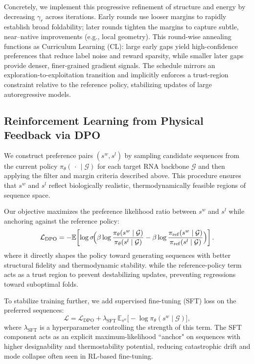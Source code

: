 Concretely, we implement this progressive refinement of structure and energy by decreasing $\gamma_r$ across iterations. Early rounds use looser margins to rapidly establish broad foldability; later rounds tighten the margins to capture subtle, near–native improvements (e.g., local geometry). This round-wise annealing functions as Curriculum Learning (CL): large early gaps yield high-confidence preferences that reduce label noise and reward sparsity, while smaller later gaps provide denser, finer-grained gradient signals. The schedule mirrors an exploration-to-exploitation transition and implicitly enforces a trust-region constraint relative to the reference policy, stabilizing updates of large autoregressive models.  


\subsection{Reinforcement Learning from Physical Feedback via DPO}
\label{subsec:rlpf_dpo}
We construct preference pairs $(s^w, s^l)$ by sampling candidate sequences from the current policy $\pi_\theta(\,\cdot\,\mid\mathcal{G})$ for each target RNA backbone $\mathcal{G}$ and then applying the filter and margin criteria described above. This procedure ensures that $s^w$ and $s^l$ reflect biologically realistic, thermodynamically feasible regions of sequence space.



Our objective maximizes the preference likelihood ratio between $s^w$ and $s^l$ while anchoring against the reference policy:
\begin{equation}
\mathcal{L}_{\mathrm{DPO}}
= -\mathbb{E}\!\left[
\log \sigma \!\Bigl(
\beta \log \frac{\pi_\theta(s^w \mid \mathcal{G})}{\pi_\theta(s^l \mid \mathcal{G})}
- \beta \log \frac{\pi_{\mathrm{ref}}(s^w \mid \mathcal{G})}{\pi_{\mathrm{ref}}(s^l \mid \mathcal{G})}
\Bigr)
\right].
\end{equation}
where it directly shapes the policy toward generating sequences with better structural fidelity and thermodynamic stability. 
while the reference-policy term acts as a trust region to prevent destabilizing updates, preventing regressions toward suboptimal folds.

To stabilize training further, we add supervised fine-tuning (SFT) loss on the preferred sequences:
\begin{equation}
\mathcal{L}
= \mathcal{L}_{\mathrm{DPO}}
+ \lambda_{\mathrm{SFT}}\,
\mathbb{E}_{s^w}\bigl[-\log \pi_\theta(s^w \mid \mathcal{G})\bigr],
\end{equation}
where $\lambda_{\mathrm{SFT}}$ is a hyperparameter controlling the strength of this term.  
The SFT component acts as an explicit maximum-likelihood ``anchor" on sequences with higher designability and thermostability potential, reducing catastrophic drift and mode collapse often seen in RL-based fine-tuning.  

